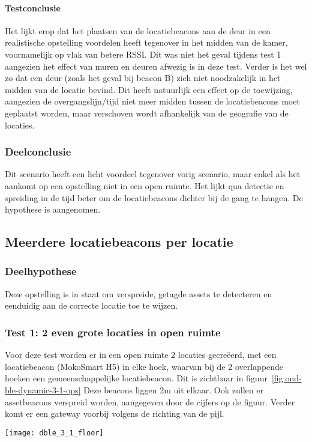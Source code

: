 \paragraph{Testconclusie}
Het lijkt erop dat het plaatsen van de locatiebeacons aan de deur in een realistische opstelling voordelen heeft tegenover in het midden van de kamer, voornamelijk op vlak van betere RSSI. Dit was niet het geval tijdens test 1 aangezien het effect van muren en deuren afwezig is in deze test. Verder is het wel zo dat een deur (zoals het geval bij beacon B) zich niet noodzakelijk in het midden van de locatie bevind. Dit heeft natuurlijk een effect op de toewijzing, aangezien de overgangslijn/tijd niet meer midden tussen de locatiebeacons moet geplaatst worden, maar verschoven wordt afhankelijk van de geografie van de locaties.

\subsubsection{Deelconclusie}
Dit scenario heeft een licht voordeel tegenover vorig scenario, maar enkel als het aankomt op een opstelling niet in een open ruimte. Het lijkt qua detectie en spreiding in de tijd beter om de locatiebeacons dichter bij de gang te hangen. De hypothese is aangenomen.

\subsection{Meerdere locatiebeacons per locatie}
\label{sec:ond-ble-6}
\subsubsection{Deelhypothese}
Deze opstelling is in staat om verspreide, getagde assets te detecteren en eenduidig aan de correcte locatie toe te wijzen.

\subsubsection{Test 1: 2 even grote locaties in open ruimte}
\label{sec:ond-ble-6-1}
\begin{minipage}{0.55\textwidth}
Voor deze test worden er in een open ruimte 2 locaties gecreëerd, met een locatiebeacon (MokoSmart H5) in elke hoek, waarvan bij de 2 overlappende hoeken een gemeenschappelijke locatiebeacon. Dit is zichtbaar in figuur~\ref{fig:ond-ble-dynamic-3-1-ops} Deze beacons liggen 2m uit elkaar. Ook zullen er assetbeacons verspreid worden, aangegeven door de cijfers op de figuur. Verder komt er een gateway voorbij volgens de richting van de pijl. 
\end{minipage}
\hfill
\begin{minipage}{0.42\textwidth}
	\texttt{[image: dble\_3\_1\_floor]}
	\label{fig:ond-ble-dynamic-3-1-ops}
\end{minipage}

